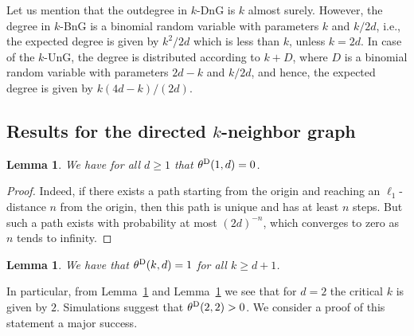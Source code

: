 \documentclass{article}
\newtheorem{lemma}[theorem]{Lemma}
\theoremstyle{definition}
\newcommand{\1}{\mathbbm{1}}
\newcommand{\0}{\mathbf{o}}
\begin{document}
Let us mention that the outdegree in $k$-DnG is $k$ almost surely. However, the degree in $k$-BnG is a binomial random variable with parameters $k$ and $k/2d$, i.e., the expected degree is given by $k^2/2d$ which is less than $k$, unless $k=2d$. In case of the $k$-UnG, the degree is distributed according to $k+D$, where $D$ is a binomial random variable with parameters $2d-k$ and $k/2d$, and hence, the expected degree is given by $k(4d-k)/(2d)$.

\subsection{Results for the directed $k$-neighbor graph}\label{sec:D}
\begin{lemma}\label{lem:surenoperc}
We have for all $d\ge 1$ that $\theta^{\rm D}(1,d)=0$.
\end{lemma}
\begin{proof}
Indeed, if there exists a path starting from the origin and reaching an $\ell_1$-distance $n$ from the origin, then this path is unique and has at least $n$ steps. But such a path exists with probability at most $(2d)^{-n}$, which converges to zero as $n$ tends to infinity.
\end{proof}
\begin{lemma}\label{lem:sureperc}
    We have that $\theta^{\rm D}(k,d)=1$ for all $k\ge d+1$.
\end{lemma}
In particular, from Lemma~\ref{lem:surenoperc} and Lemma~\ref{lem:sureperc} we see that for $d=2$ the critical $k$ is given by $2$. Simulations suggest that $\theta^{\rm D}(2,2)>0$. We consider a proof of this statement a major success. 
\end{document}
